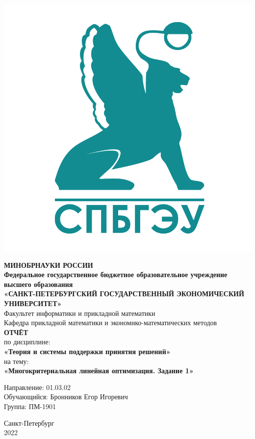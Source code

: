 \documentclass[14pt,fleqn]{extarticle}
\begin{document}
	\begin{titlepage}
		\includegraphics[scale=0.12]{logo}
		\begin{center}
			\textbf{МИНОБРНАУКИ РОССИИ}\\
			\vspace{0.2cm}
			\textbf{Федеральное государственное бюджетное образовательное учреждение высшего образования}\\
			\textbf{«САНКТ-ПЕТЕРБУРГСКИЙ ГОСУДАРСТВЕННЫЙ ЭКОНОМИЧЕСКИЙ УНИВЕРСИТЕТ»}\\
			\vspace{0.6cm}
			Факультет информатики и прикладной математики\\
			Кафедра прикладной математики и экономико-математических методов\\
			\vspace{1cm}
			\textbf{ОТЧЁТ}\\
			по дисциплине:\\
			\textbf{«Теория и системы поддержки принятия решений»}\\
			на тему:\\
			\textbf{«Многокритериальная линейная оптимизация. Задание 1»}\\
		\end{center}
		\vspace{1cm}
		Направление: 01.03.02\\
		Обучающийся: Бронников Егор Игоревич\\
		Группа: ПМ-1901\\
		\vfill
		\begin{center}
			Санкт-Петербург\\
			2022\\
		\end{center}
	\end{titlepage}
\end{document}
